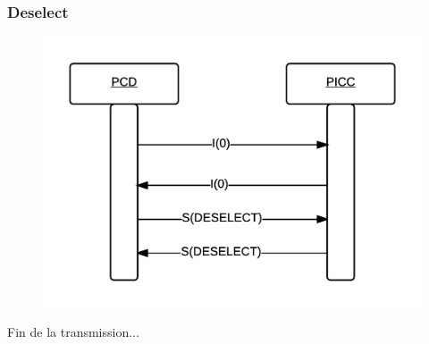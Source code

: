 \documentclass{beamer}
\begin{document}
\begin{frame}
\frametitle{Deselect}
\begin{figure}
\centering
\includegraphics[scale=0.5]{images/deselect.png}
\end{figure}
Fin de la transmission...
\end{frame}

\end{document}

